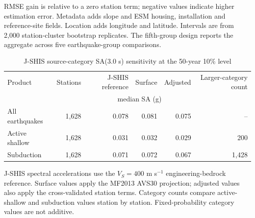 \documentclass[10pt]{article}
\begin{document}
\begin{table}[H]
\vspace{0.3em}
\raggedright\footnotesize RMSE gain is relative to a zero station term; negative values indicate higher estimation error. Metadata adds slope and ESM housing, installation and reference-site fields. Location adds longitude and latitude. Intervals are from 2,000 station-cluster bootstrap replicates. The fifth-group design reports the aggregate across five earthquake-group comparisons.
\end{table}

\begin{table}[H]
\centering
\caption{J-SHIS source-category SA(3.0 s) sensitivity at the 50-year 10\% level}
\small
\begin{tabular}{lrrrrr}
\toprule
Product & Stations & J-SHIS reference & Surface & Adjusted & Larger-category count \\
 & & \multicolumn{3}{c}{median SA (g)} & \\
\midrule
All earthquakes & 1,628 & 0.078 & 0.081 & 0.075 & -- \\
Active shallow & 1,628 & 0.031 & 0.032 & 0.029 & 200 \\
Subduction & 1,628 & 0.071 & 0.072 & 0.067 & 1,428 \\
\bottomrule
\end{tabular}

\vspace{0.3em}
\raggedright\footnotesize J-SHIS spectral accelerations use the $V_S=400$ m s$^{-1}$ engineering-bedrock reference. Surface values apply the MF2013 AVS30 projection; adjusted values also apply the cross-validated station terms. Category counts compare active-shallow and subduction values station by station. Fixed-probability category values are not additive.
\end{table}
\end{document}
